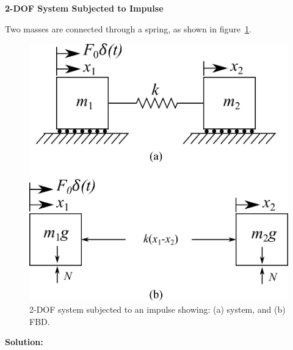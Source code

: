 \documentclass[12pt,letter]{article}
\begin{document}
	
	\begin{example}
	\textbf{2-DOF System Subjected to Impulse}
	
	Two masses are connected through a spring, as shown in figure~\ref{fig:2-DOF-spring_mass_free}. 
	\begin{figure}[H]
		\centering
		\includegraphics[]{../figures/2-DOF-spring_mass_free.png}
		\caption{2-DOF system subjected to an impulse showing: (a) system, and (b) FBD.}
		\label{fig:2-DOF-spring_mass_free}
	\end{figure}

\noindent \textbf{Solution:}


\end{example}
\end{document}

